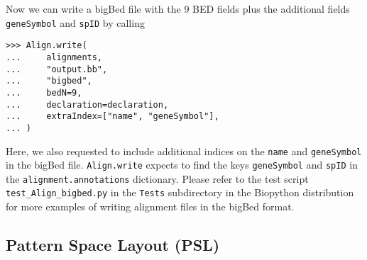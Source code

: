 Now we can write a bigBed file with the 9 BED fields plus the additional fields \verb|geneSymbol| and \verb|spID| by calling
\begin{verbatim}
>>> Align.write(
...     alignments,
...     "output.bb",
...     "bigbed",
...     bedN=9,
...     declaration=declaration,
...     extraIndex=["name", "geneSymbol"],
... )
\end{verbatim}
Here, we also requested to include additional indices on the \verb|name| and \verb|geneSymbol| in the bigBed file. \verb|Align.write| expects to find the keys \verb|geneSymbol| and \verb|spID| in the \verb|alignment.annotations| dictionary.
 Please refer to the test script \verb|test_Align_bigbed.py| in the \verb|Tests| subdirectory in the Biopython distribution for more examples of writing alignment files in the bigBed format.


\subsection{Pattern Space Layout (PSL)}
\label{subsec:align_psl}

